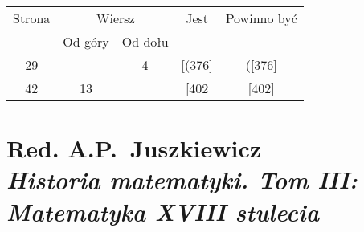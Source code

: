\documentclass[a4paper,11pt]{article}
\numberwithin{equation}{section}
\begin{document}
\newpage



\begin{center}

  \begin{tabular}{|c|c|c|c|c|}
    \hline
    Strona & \multicolumn{2}{c|}{Wiersz} & Jest
                              & Powinno być \\ \cline{2-3}
    & Od góry & Od dołu & & \\
    \hline
    29  & &  4 & [(376] & ([376] \\
    42  & 13 & & [402 & [402] \\
    \hline
  \end{tabular}

\end{center}

\vspace{\spaceTwo}
















\newpage

\section{ %
  Red. A.P.~Juszkiewicz \\
  \textit{Historia matematyki. Tom III: Matematyka XVIII stulecia} \\
  \cite{RedJuszkiewiczHistoriaMatematykiVolIII1977}}












\end{document}
